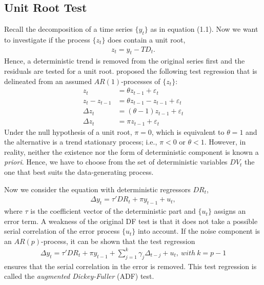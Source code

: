 \documentclass[12pt]{article}
\theoremstyle{definition}
\numberwithin{equation}{section}
\numberwithin{figure}{section}
\numberwithin{table}{section}
\begin{document}
\subsection{Unit Root Test}

Recall the decomposition of a time series $\{y_t \}$ as in equation (1.1). Now we want to investigate if the process $\{z_t\}$ does contain a unit root,
\begin{align*}
  z_t = y_t - TD_t.
\end{align*}
Hence, a deterministic trend is removed from the original series first and the residuals are tested for a unit root. \cite{dickey1979distribution} proposed the following test regression that is delineated from an assumed $AR(1)$-processes of $\{z_t\}$:
\begin{align}
  z_t & = \theta z_{t-1} + \varepsilon_t\\
  z_t - z_{t-1} & = \theta z_{t-1} - z_{t-1} + \varepsilon_t \\
  \Delta z_t & = (\theta - 1) z_{t-1} + \varepsilon_t \\
  \Delta z_t & = \pi z_{t-1} + \varepsilon_t
\end{align}
Under the null hypothesis of a unit root, $\pi = 0$, which is equivalent to $\theta = 1$ and the alternative is a trend stationary process; i.e., $\pi < 0$ or $\theta < 1$. However, in reality, neither the existence nor the form of deterministic component is known a \textit{priori}. Hence, we have to choose from the set of deterministic variables $DV_t$ the one that best suits the data-generating process.

Now we consider the equation with deterministic regressors $DR_t$,
\begin{align}
  \Delta y_t = \tau' DR_t + \pi y_{t-1} + u_t,
\end{align}
where $\tau$ is the coefficient vector of the deterministic part and $\{u_t\}$ assigns an error term. A weakness of the original DF test is that it does not take a possible serial correlation of the error process $\{u_t\}$ into account. If the noise component is an $AR(p)$-process, it can be shown that the test regression
\begin{align}
  \Delta y_t = \tau' DR_t + \pi y_{t-1} + \sum_{j=1}^k \gamma_j \Delta_{t-j} + u_t, \ with \ k = p - 1
\end{align}
ensures that the serial correlation in the error is removed. This test regression is called the \textit{augmented Dickey-Fuller} (ADF) test.
\end{document}
